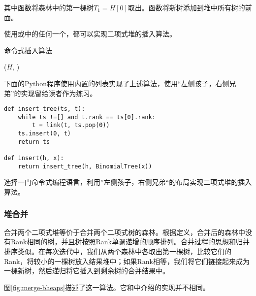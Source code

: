 \documentclass[UTF8]{article}
\begin{document}
其中函数将森林中的第一棵树$T_1 = H[0]$取出。函数将新树添加到堆中所有树的前面。

使用或中的任何一个，都可以实现二项式堆的插入算法。

\begin{algorithm}
\caption{命令式插入算法}
\label{alg:bheap-insert}
\begin{algorithmic}[1]
  \State \Return {}($H$, )
\EndFunction
\end{algorithmic}
\end{algorithm}

下面的Python程序使用内置的列表实现了上述算法，使用“左侧孩子，右侧兄弟”的实现留给读者作为练习。

\lstset{language=Python}
\begin{lstlisting}
def insert_tree(ts, t):
    while ts !=[] and t.rank == ts[0].rank:
        t = link(t, ts.pop(0))
    ts.insert(0, t)
    return ts

def insert(h, x):
    return insert_tree(h, BinomialTree(x))
\end{lstlisting}

\begin{Exercise}
选择一门命令式编程语言，利用”左侧孩子，右侧兄弟“的布局实现二项式堆的插入算法。
\end{Exercise}


\subsubsection{堆合并}

合并两个二项式堆等价于合并两个二项式树的森林。根据定义，合并后的森林中没有Rank相同的树，并且树按照Rank单调递增的顺序排列。合并过程的思想和归并排序类似。在每次迭代中，我们从两个森林中各取出第一棵树，比较它们的Rank，将较小的一棵树放入结果堆中；如果Rank相等，我们将它们链接起来成为一棵新树，然后递归将它插入到剩余树的合并结果中。

图\ref{fig:merge-bheaps}描述了这一算法。它和\cite{CLRS}中介绍的实现并不相同。
\end{document}
